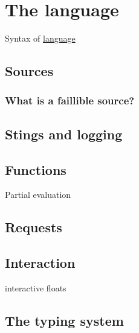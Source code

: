\chapter{The language}
Syntax of \href{https://www.liquidsoap.info/doc-dev/language.html}{\Liquidsoap language}

\section{Sources}
\subsection{What is a faillible source?}

\section{Stings and logging}

\section{Functions}
Partial evaluation

\section{Requests}

\section{Interaction}
interactive floats

\section{The typing system}
